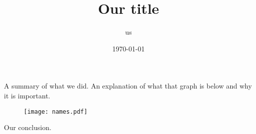 \documentclass{article}
\begin{document}
\title{Our title}
\author{us}
\date{\today}
\maketitle


\noindent A summary of what we did. An explanation of what that graph is below and why it is important.

\begin{figure}[htpb]
  \centering
  \texttt{[image: names.pdf]} %
  \label{fig:names}
\end{figure}


\noindent Our conclusion.
\end{document}
